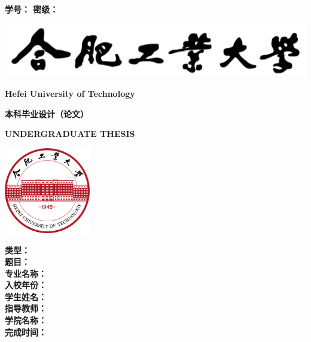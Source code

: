 \begin{titlepage}
    {
        \heiti \bfseries
        学\hspace{1.5em}号：\underlineFixlen[3.5cm]{\studentID} \hfill
        密\hspace{1.5em}级：\underlineFixlen[3.5cm]{\privacy}
    }

    \centering
    {\vspace{1.7cm} \includegraphics{img/hfut_name.png}\vspace{0.3cm}}

    {\LARGE \bfseries Hefei University of Technology}\vspace{0.7cm}

    {\chuhao \heiti \bfseries 本科毕业设计（论文）}\vspace{0.5cm}

    {\LARGE \bfseries UNDERGRADUATE THESIS}\vspace{0.9cm}

    {\includegraphics[width=3.76cm, height=3.76cm]{img/hfut_logo.png}\vspace{0.5cm}}

    {
    \linespread{1.8}
    \songti \sanhao
    {\bfseries 类\hspace{2em}型：}\underlineFixlen[8.8cm]{\type}\\
    {\bfseries 题\hspace{2em}目：}\underlineFixlen[8.8cm]{\titleCn}\\
    {\bfseries 专业名称：}\underlineFixlen[8.8cm]{\major}\\
    {\bfseries 入校年份：}\underlineFixlen[8.8cm]{\enrolmentYear}\\
    {\bfseries 学生姓名：}\underlineFixlen[8.8cm]{\studentNameCn}\\
    {\bfseries 指导教师：}\underlineFixlen[8.8cm]{\supervisor}\\
    {\bfseries 学院名称：}\underlineFixlen[8.8cm]{\department}\\
    {\bfseries 完成时间：}\\
    }
\end{titlepage}

